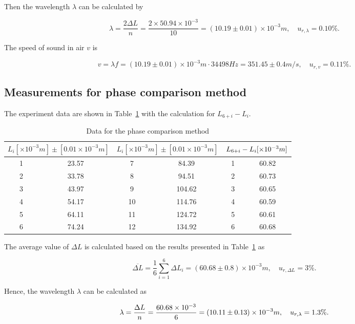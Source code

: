 Then the wavelength $\lambda$ can be calculated by

\[
        \lambda=\frac{2\Delta L}{n}=\frac{2\times50.94\times 10^{-3} 
        }{10}=(10.19 \pm0.01)\times 10^{-3} m,\quad u_{r,\lambda}=0.10\%. 
\]

The speed of sound in air $v$ is

\[
    v=\lambda f = (10.19 \pm 0.01)\times 10^{-3} m \cdot 34498 Hz  = 351.45 \pm
    0.4 m/s,\quad u_{r,v}=0.11\%. 
\]

\subsection{Measurements for phase comparison method}

The experiment data  are shown in Table~\ref{d2} with the calculation for $L_{6+i}-L_i$.

\begin{table}[H] \small
    \centering
    \begin{tabular}{|c|c|c|c|c|c|}
    \hline
        \multicolumn{2}{|c|}{$L_i[\times 10^{-3} m]\pm[0.01\times 10^{-3} m]$} & 
        \multicolumn{2}{|c|}{$L_i[\times 10^{-3} m]\pm[0.01\times 10^{-3} m]$} &
        \multicolumn{2}{|c|}{$L_{6+i}-L_i[\times 10^{-3}m]$}\\\hline
        1 & 23.57 & 7  &  84.39 & 1 & 60.82 \\\hline
        2 & 33.78 & 8  &  94.51 & 2 & 60.73 \\\hline
        3 & 43.97 & 9  & 104.62 & 3 & 60.65 \\\hline
        4 & 54.17 & 10 & 114.76 & 4 & 60.59 \\\hline
        5 & 64.11 & 11 & 124.72 & 5 & 60.61 \\\hline
        6 & 74.24 & 12 & 134.92 & 6 & 60.68 \\\hline
    \end{tabular}
    \caption{Data for the phase comparison method}\label{d2}
\end{table}
    
The average value of $\Delta L$ is calculated  based on the results presented in Table~\ref{d2} as

\[
    \overline{\Delta L}=\frac{1}{6}\sum_{i=1}^{6}\Delta L_i=(60.68\pm 0.8)\times
    10^{-3} m,\quad u_{r,\Delta L}=3\%. 
\]

Hence, the wavelength $\lambda$ can be calculated as

\[
    \lambda=\frac{\Delta L}{n}=\frac{60.68 \times 10^{-3}}{6}=(10.11 \pm 0.13)\times
    10^{-3} m,\quad u_{r,\lambda}=1.3\%. 
\]

